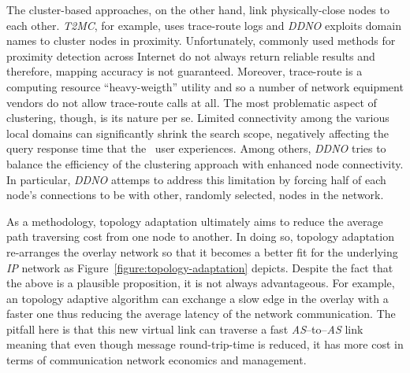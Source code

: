 The cluster-based approaches, on the other hand, 
link physically-close nodes to each other. 
\emph{T2MC}, for example, uses trace-route logs and 
\emph{DDNO} exploits domain names to cluster nodes in proximity. 
Unfortunately, commonly used
methods for proximity detection across Internet do not always return
reliable results and therefore, mapping accuracy is not guaranteed. 
Moreover, trace-route is a computing resource ``heavy-weigth'' utility 
and so  a number of network equipment vendors do not allow
trace-route calls at all. %
The most problematic aspect of clustering, though, is
its nature per se. 
Limited connectivity among the various local domains can
significantly shrink the search scope, negatively affecting the query response
time that the \p\ user experiences. 
Among others, \emph{DDNO} tries to 
balance the efficiency of the clustering approach 
with enhanced node connectivity. 
In particular, \emph{DDNO} attemps to address this limitation
by forcing half of each node's connections to be with other, randomly
selected, nodes in the network.

As a methodology, 
topology adaptation ultimately aims to reduce the 
average path traversing cost from one node to another.
In doing so, topology adaptation  re-arranges the 
overlay network so that it becomes a better fit 
for the underlying \emph{IP} network
as Figure~\ref{figure:topology-adaptation} depicts.
Despite the fact that the above is a plausible proposition,
it is not always advantageous.
For example, an topology adaptive algorithm can exchange 
a slow edge in the overlay with a faster one
thus reducing the average latency of the network communication. 
The pitfall here is that this new virtual link 
can traverse a fast \emph{AS}--to--\emph{AS} 	
link meaning that even though message
round-trip-time is reduced, it has more cost 
in terms of communication network economics and management.


